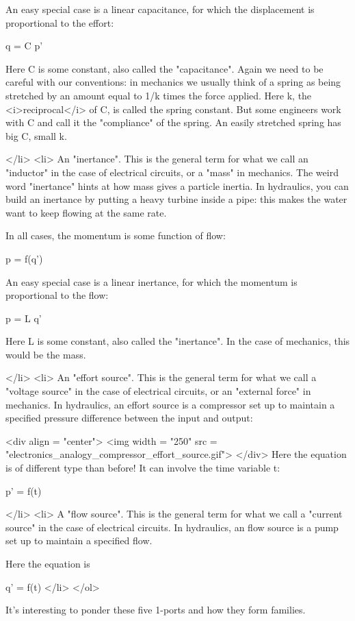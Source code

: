   An easy special case is a linear capacitance, for which the 
  displacement is proportional to the effort:

  q = C p'

  Here C is some constant, also called the "capacitance".
  Again we need to be careful with our conventions: in mechanics we
  usually think of a spring as being stretched by an amount equal to
  1/k times the force applied.  Here k, the <i>reciprocal</i> of C, is
  called the spring constant.  But some engineers work with C and call
  it the "compliance" of the spring.  An easily stretched
  spring has big C, small k.

</li>
<li> 
  An "inertance".  This is the general term for what we
  call an "inductor" in the case of electrical circuits, or
  a "mass" in mechanics.  The weird word
  "inertance" hints at how mass gives a particle inertia.
  In hydraulics, you can build an inertance by putting a heavy turbine
  inside a pipe: this makes the water want to keep flowing at the same
  rate.

  In all cases, the momentum is some function of flow:

  p = f(q')

  An easy special case is a linear inertance, for which the 
  momentum is proportional to the flow:

  p = L q'

  Here L is some constant, also called the "inertance".  In
  the case of mechanics, this would be the mass.

</li>
<li>
  An "effort source".  This is the general term for what we
  call a "voltage source" in the case of electrical
  circuits, or an "external force" in mechanics.  In 
  hydraulics, an effort source is a compressor set up to maintain a 
  specified pressure difference between the input and output:

<div align = "center">
<img width = "250" src = "electronics_analogy_compressor_effort_source.gif">
</div>
Here the
equation is of different type than before!  It can involve the time
variable t:

  p' = f(t)
  
</li>
<li>
  A "flow source".  This is the general term for what we
  call a "current source" in the case of electrical
  circuits.  In hydraulics, an flow source is a pump set up to
  maintain a specified flow.

Here the equation is

  q' = f(t)
</li>
</ol>

It's interesting to ponder these five 1-ports and how they form
families.

